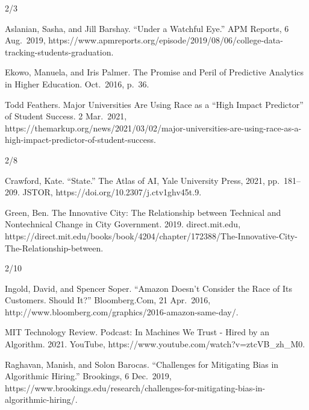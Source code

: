 \documentclass[
]{article}
\newlength{\cslhangindent}
\newlength{\cslentryspacingunit} %
\newenvironment{CSLReferences}[2] %
 {%
  \setlength{\parindent}{0pt}
  \ifodd #1
  \let\oldpar\par
  \def\par{\hangindent=\cslhangindent\oldpar}
  \fi
  \setlength{\parskip}{#2\cslentryspacingunit}
 }%
 {}
\begin{document}
2/3

\begin{CSLReferences}{0}{0}
Aslanian, Sasha, and Jill Barshay. ``Under a Watchful Eye.'' APM
Reports, 6 Aug.~2019,
https://www.apmreports.org/episode/2019/08/06/college-data-tracking-students-graduation.

{}

Ekowo, Manuela, and Iris Palmer. The Promise and Peril of Predictive
Analytics in Higher Education. Oct.~2016, p.~36.

{}

Todd Feathers. Major Universities Are Using Race as a ``High Impact
Predictor'' of Student Success. 2 Mar.~2021,
https://themarkup.org/news/2021/03/02/major-universities-are-using-race-as-a-high-impact-predictor-of-student-success.

{}

\end{CSLReferences}

2/8

\begin{CSLReferences}{0}{0}
Crawford, Kate. ``State.'' The Atlas of AI, Yale University Press, 2021,
pp.~181--209. JSTOR, https://doi.org/10.2307/j.ctv1ghv45t.9.

{}

Green, Ben. The Innovative City: The Relationship between Technical and
Nontechnical Change in City Government. 2019. direct.mit.edu,
https://direct.mit.edu/books/book/4204/chapter/172388/The-Innovative-City-The-Relationship-between.

{}

\end{CSLReferences}

2/10

\begin{CSLReferences}{0}{0}
Ingold, David, and Spencer Soper. ``Amazon Doesn't Consider the Race of
Its Customers. Should It?'' Bloomberg.Com, 21 Apr.~2016,
http://www.bloomberg.com/graphics/2016-amazon-same-day/.

{}

MIT Technology Review. Podcast: In Machines We Trust - Hired by an
Algorithm. 2021. YouTube, https://www.youtube.com/watch?v=ztcVB\_zh\_M0.

{}

Raghavan, Manish, and Solon Barocas. ``Challenges for Mitigating Bias in
Algorithmic Hiring.'' Brookings, 6 Dec.~2019,
https://www.brookings.edu/research/challenges-for-mitigating-bias-in-algorithmic-hiring/.

{}

\end{CSLReferences}
\end{document}
